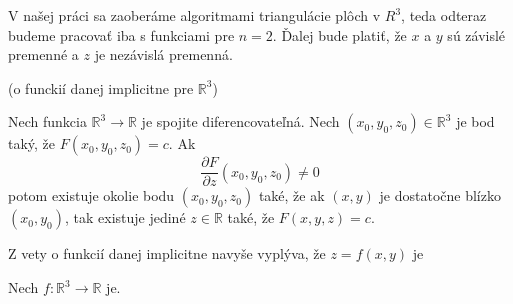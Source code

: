 V našej práci sa zaoberáme algoritmami triangulácie plôch v $R^3$, teda odteraz
budeme pracovať iba s funkciami pre $n = 2$. Ďalej bude platiť, že $x$ a $y$ sú 
závislé premenné a $z$ je nezávislá premenná.


\begin{theorem}
 (o funckií danej implicitne pre $\mathbb{R}^3$)
 
 Nech funkcia $\mathbb{R}^3 \to \mathbb{R}$ je spojite diferencovateľná. 
 Nech $(x_0, y_0, z_0) \in \mathbb{R}^3$ je bod taký, že $F(x_0, y_0, z_0) = c$.
 Ak $$\frac{\partial F}{\partial z} (x_0, y_0, z_0) \neq 0$$ potom existuje okolie 
 bodu $(x_0, y_0, z_0)$ také, že ak $(x, y)$ je dostatočne blízko $(x_0, y_0)$, tak 
 existuje jediné $z \in \mathbb{R}$ také, že $F(x, y, z) = c$.
\end{theorem}

\begin{note}
    Z vety o funkcií danej implicitne navyše vyplýva, že $z = f(x, y)$ je 
    
\end{note}



\begin{definition}
    Nech $f : \mathbb{R}^3 \to \mathbb{R}$ je.
\end{definition}





